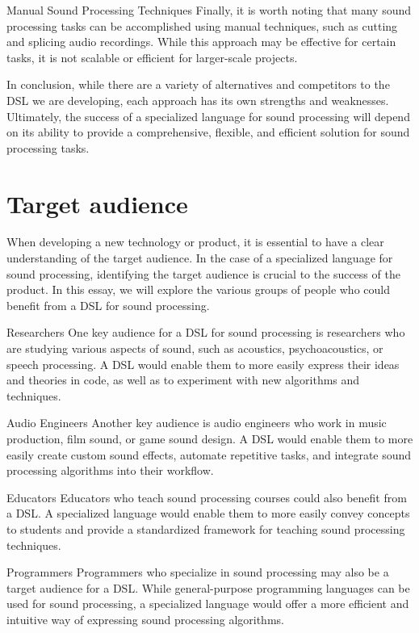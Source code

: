 Manual Sound Processing Techniques
Finally, it is worth noting that many sound processing tasks can be accomplished using manual techniques, such as cutting and splicing audio recordings. While this approach may be effective for certain tasks, it is not scalable or efficient for larger-scale projects.

In conclusion, while there are a variety of alternatives and competitors to the DSL we are developing, each approach has its own strengths and weaknesses. Ultimately, the success of a specialized language for sound processing will depend on its ability to provide a comprehensive, flexible, and efficient solution for sound processing tasks.

\section{Target audience} 
When developing a new technology or product, it is essential to have a clear understanding of the target audience. In the case of a specialized language for sound processing, identifying the target audience is crucial to the success of the product. In this essay, we will explore the various groups of people who could benefit from a DSL for sound processing.

Researchers
One key audience for a DSL for sound processing is researchers who are studying various aspects of sound, such as acoustics, psychoacoustics, or speech processing. A DSL would enable them to more easily express their ideas and theories in code, as well as to experiment with new algorithms and techniques.

Audio Engineers
Another key audience is audio engineers who work in music production, film sound, or game sound design. A DSL would enable them to more easily create custom sound effects, automate repetitive tasks, and integrate sound processing algorithms into their workflow.

Educators
Educators who teach sound processing courses could also benefit from a DSL. A specialized language would enable them to more easily convey concepts to students and provide a standardized framework for teaching sound processing techniques.

Programmers
Programmers who specialize in sound processing may also be a target audience for a DSL. While general-purpose programming languages can be used for sound processing, a specialized language would offer a more efficient and intuitive way of expressing sound processing algorithms.

